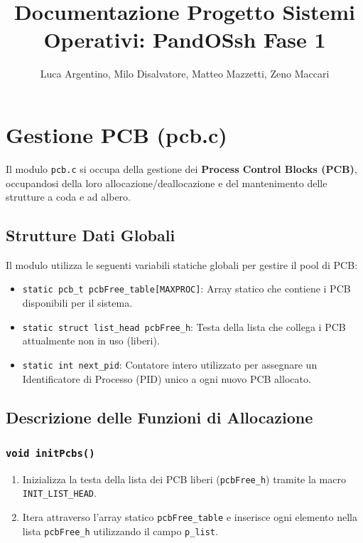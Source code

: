 \documentclass[a4paper,12pt]{article}
\title{Documentazione Progetto Sistemi Operativi: PandOSsh Fase 1}
\author{Luca Argentino, Milo Disalvatore, Matteo Mazzetti, Zeno Maccari}
\begin{document}
\maketitle

\section{Gestione PCB (pcb.c)}
Il modulo \texttt{pcb.c} si occupa della gestione dei \textbf{Process Control Blocks (PCB)}, occupandosi della loro allocazione/deallocazione e del mantenimento delle strutture a coda e ad albero.

\vspace{0.5cm}
\subsection{Strutture Dati Globali}
Il modulo utilizza le seguenti variabili statiche globali per gestire il pool di PCB:

\begin{itemize}
    \item \texttt{static pcb\_t pcbFree\_table[MAXPROC]}: Array statico che contiene i PCB disponibili per il sistema.
    \item \texttt{static struct list\_head pcbFree\_h}: Testa della lista che collega i PCB attualmente non in uso (liberi).
    \item \texttt{static int next\_pid}: Contatore intero utilizzato per assegnare un Identificatore di Processo (PID) unico a ogni nuovo PCB allocato.
\end{itemize}

\vspace{0.5cm}
\subsection{Descrizione delle Funzioni di Allocazione}

\subsubsection{\texttt{void initPcbs()}}
\begin{enumerate}
    \item Inizializza la testa della lista dei PCB liberi (\texttt{pcbFree\_h}) tramite la macro \texttt{INIT\_LIST\_HEAD}.
    \item Itera attraverso l'array statico \texttt{pcbFree\_table} e inserisce ogni elemento nella lista \texttt{pcbFree\_h} utilizzando il campo \texttt{p\_list}.
\end{enumerate}
\end{document}
